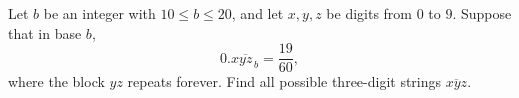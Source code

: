 Let $b$ be an integer with $10\le b\le20$, and let $x,y,z$ be digits from $0$ to $9$. Suppose that in base $b$,
\[0.x\overline{yz}_{\,b}=\dfrac{19}{60},\]
where the block $yz$ repeats forever. Find all possible three-digit strings $\overline{xyz}$.
